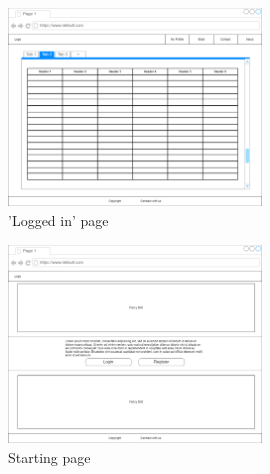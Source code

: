 \documentclass[a4paper, 12pt]{article}
\begin{document}
    \begin{figure}[htbp]
        \centering
        \includegraphics[width=0.6\textwidth]{loggedIn_starting_site}
        \caption{'Logged in' page}
    \end{figure}

    \begin{figure}[htbp]
        \centering
        \includegraphics[width=0.6\textwidth]{Starting_site}
        \caption{Starting page}
    \end{figure}
\end{document}
